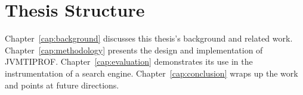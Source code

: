 \section{Thesis Structure}

Chapter~\ref{cap:background} discusses this thesis's background and related work. Chapter~\ref{cap:methodology} presents the design and implementation of JVMTIPROF. Chapter~\ref{cap:evaluation} demonstrates its use in the instrumentation of a search engine. Chapter~\ref{cap:conclusion} wraps up the work and points at future directions.


